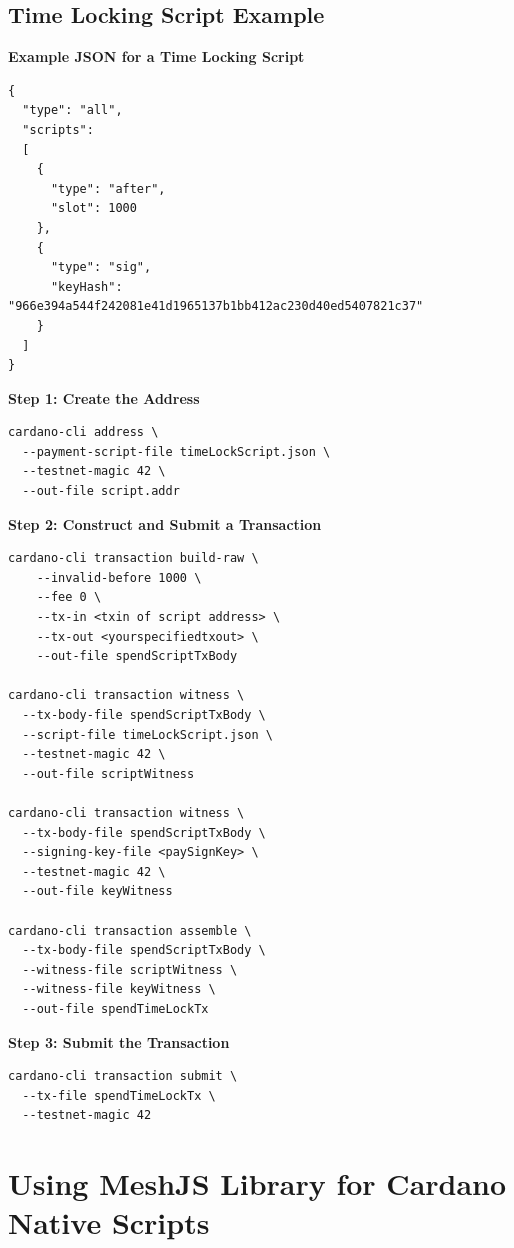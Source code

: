\subsection{Time Locking Script Example}

\textbf{Example JSON for a Time Locking Script}

\begin{lstlisting}
{
  "type": "all",
  "scripts":
  [
    {
      "type": "after",
      "slot": 1000
    },
    {
      "type": "sig",
      "keyHash": "966e394a544f242081e41d1965137b1bb412ac230d40ed5407821c37"
    }
  ]
}
\end{lstlisting}

\textbf{Step 1: Create the Address}

\begin{verbatim}
cardano-cli address \
  --payment-script-file timeLockScript.json \
  --testnet-magic 42 \
  --out-file script.addr
\end{verbatim}

\textbf{Step 2: Construct and Submit a Transaction}

\begin{verbatim}
cardano-cli transaction build-raw \
    --invalid-before 1000 \
    --fee 0 \
    --tx-in <txin of script address> \
    --tx-out <yourspecifiedtxout> \
    --out-file spendScriptTxBody

cardano-cli transaction witness \
  --tx-body-file spendScriptTxBody \
  --script-file timeLockScript.json \
  --testnet-magic 42 \
  --out-file scriptWitness

cardano-cli transaction witness \
  --tx-body-file spendScriptTxBody \
  --signing-key-file <paySignKey> \
  --testnet-magic 42 \
  --out-file keyWitness

cardano-cli transaction assemble \
  --tx-body-file spendScriptTxBody \
  --witness-file scriptWitness \
  --witness-file keyWitness \
  --out-file spendTimeLockTx
\end{verbatim}

\textbf{Step 3: Submit the Transaction}

\begin{verbatim}
cardano-cli transaction submit \
  --tx-file spendTimeLockTx \
  --testnet-magic 42
\end{verbatim}

\section{Using MeshJS Library for Cardano Native Scripts}

